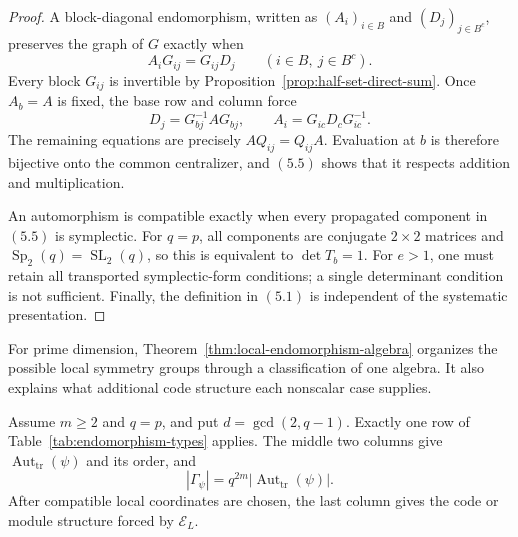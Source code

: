\begin{proof}
A block-diagonal endomorphism, written as \((A_i)_{i\in B}\) and
\((D_j)_{j\in B^c}\), preserves the graph of \(G\) exactly when
\[
 A_iG_{ij}=G_{ij}D_j\qquad(i\in B,\ j\in B^c).         \tag{5.4}
\]
Every block \(G_{ij}\) is invertible by
Proposition~\ref{prop:half-set-direct-sum}.  Once \(A_b=A\) is fixed, the
base row and column force
\[
 D_j=G_{bj}^{-1}AG_{bj},\qquad
 A_i=G_{ic}D_cG_{ic}^{-1}.                             \tag{5.5}
\]
The remaining equations are precisely \(AQ_{ij}=Q_{ij}A\).  Evaluation
at \(b\) is therefore bijective onto the common centralizer, and
\((5.5)\) shows that it respects addition and multiplication.

An automorphism is compatible exactly when every propagated component in
\((5.5)\) is symplectic.  For \(q=p\), all components are conjugate
\(2\times2\) matrices and \(\operatorname{Sp}_2(q)=\operatorname{SL}_2(q)\),
so this is equivalent to \(\det T_b=1\).  For \(e>1\), one must retain all
transported symplectic-form conditions; a single determinant condition is
not sufficient.  Finally, the definition in \((5.1)\) is independent of
the systematic presentation.
\end{proof}

For prime dimension, Theorem~\ref{thm:local-endomorphism-algebra} organizes
the possible local symmetry groups through a classification of one algebra.  It also explains what additional code structure each nonscalar
case supplies.

\begin{corollary}
\label{cor:endomorphism-types}
Assume \(m\geq2\) and \(q=p\), and put \(d=\gcd(2,q-1)\).  Exactly one row of
Table~\ref{tab:endomorphism-types} applies.  The middle two columns give
\(\operatorname{Aut}_{\mathrm{tr}}(\psi)\) and its order, and
\[
 |\Gamma_\psi|=q^{2m}|\operatorname{Aut}_{\mathrm{tr}}(\psi)|.
\]
After compatible local coordinates are chosen, the last column gives the
code or module structure forced by \(\mathcal E_L\).
\end{corollary}

